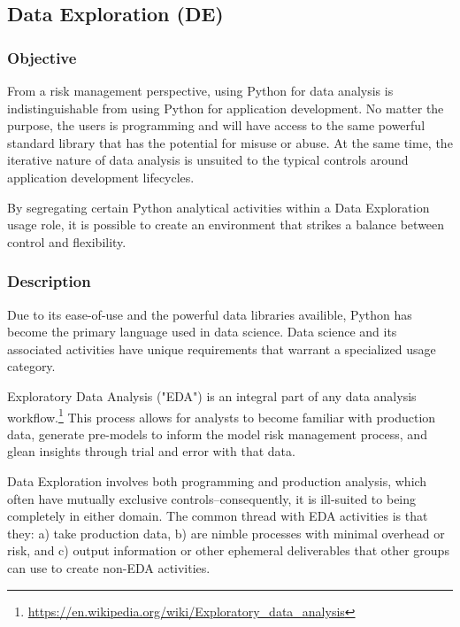 
	\subsection{Data Exploration (DE)}

		\subsubsection{Objective}

			From a risk management perspective, using Python for data analysis is indistinguishable from using Python for application development. No matter the purpose, the users is programming and will have access to the same powerful standard library that has the potential for misuse or abuse. At the same time, the iterative nature of data analysis is unsuited to the typical controls around application development lifecycles. 

			By segregating certain Python analytical activities within a Data Exploration usage role, it is possible to create an environment that strikes a balance between control and flexibility.

		\subsubsection{Description}

			Due to its ease-of-use and the powerful data libraries availible, Python has become the primary language used in data science. Data science and its associated activities have unique requirements that warrant a specialized usage category. 

			Exploratory Data Analysis ("EDA") is an integral part of any data analysis workflow.\footnote{\url{https://en.wikipedia.org/wiki/Exploratory_data_analysis}} This process allows for analysts to become familiar with production data, generate pre-models to inform the model risk management process, and glean insights through trial and error with that data. 

			Data Exploration involves both programming and production analysis, which often have mutually exclusive controls--consequently, it is ill-suited to being completely in either domain. The common thread with EDA activities is that they: a) take production data, b) are nimble processes with minimal overhead or risk, and c) output information or other ephemeral deliverables that other groups can use to create non-EDA activities.

